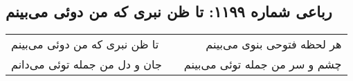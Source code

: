 \begin{center}
\section*{رباعی شماره ۱۱۹۹: تا ظن نبری که من دوئی می‌بینم}
\label{sec:1199}
\begin{longtable}{l p{0.5cm} r}
تا ظن نبری که من دوئی می‌بینم
&&
هر لحظه فتوحی بنوی می‌بینم
\\
جان و دل من جمله توئی می‌دانم
&&
چشم و سر من جمله توئی می‌بینم
\\
\end{longtable}
\end{center}
